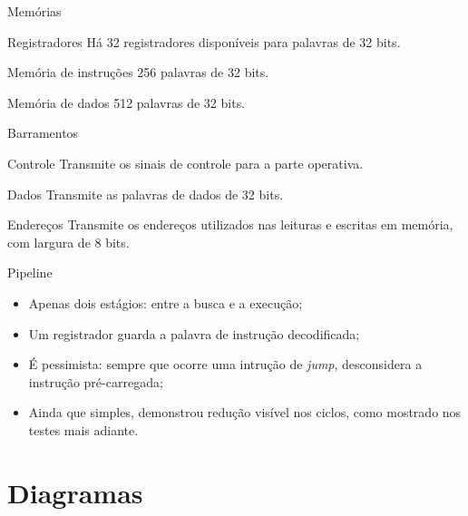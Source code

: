 \documentclass{beamer}
\begin{document}
		\begin{frame}{Memórias}
			
			\begin{block}{Registradores}
			Há 32 registradores disponíveis para palavras de 32 bits.
			\end{block}

			\begin{block}{Memória de instruções}
			256 palavras de 32 bits.
			\end{block}

			\begin{block}{Memória de dados}
			512 palavras de 32 bits.
			\end{block}

		\end{frame}

		\begin{frame}{Barramentos}
			\begin{block}{Controle}
			Transmite os sinais de controle para
			a parte operativa.
			\end{block}

			\begin{block}{Dados}
			Transmite as palavras de dados de 32 bits.
			\end{block}

			\begin{block}{Endereços}
			Transmite os endereços utilizados nas
			leituras e escritas em memória, com largura de 8 bits.
			\end{block}
		\end{frame}

		\begin{frame}{Pipeline}
			\begin{itemize}
				\item<1-> Apenas dois estágios: entre a busca e a execução;
				\item<2-> Um registrador guarda a palavra de instrução decodificada;
				\item<3-> É pessimista: sempre que ocorre uma intrução de \emph{jump},
					desconsidera a instrução pré-carregada;
				\item<4-> Ainda que simples, demonstrou redução visível nos ciclos, como
					mostrado nos testes mais adiante.
			\end{itemize}
		\end{frame}


	\section{Diagramas}
	
\end{document}
